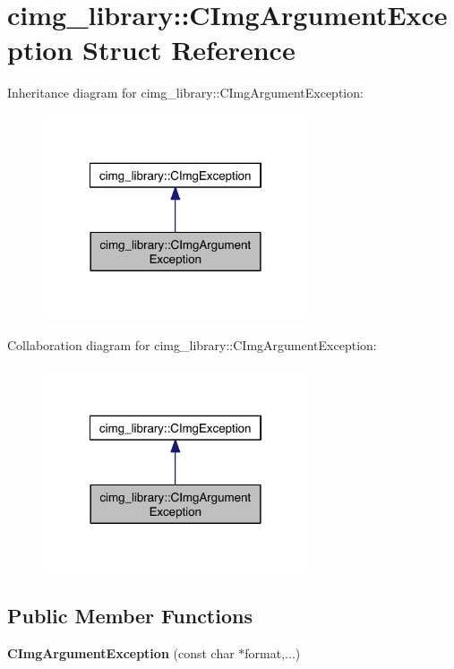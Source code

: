 \hypertarget{structcimg__library_1_1_c_img_argument_exception}{\section{cimg\-\_\-library\-:\-:C\-Img\-Argument\-Exception Struct Reference}
\label{structcimg__library_1_1_c_img_argument_exception}
}


Inheritance diagram for cimg\-\_\-library\-:\-:C\-Img\-Argument\-Exception\-:
\nopagebreak
\begin{figure}[H]
\begin{center}
\leavevmode
\includegraphics[width=222pt]{structcimg__library_1_1_c_img_argument_exception__inherit__graph}
\end{center}
\end{figure}


Collaboration diagram for cimg\-\_\-library\-:\-:C\-Img\-Argument\-Exception\-:
\nopagebreak
\begin{figure}[H]
\begin{center}
\leavevmode
\includegraphics[width=222pt]{structcimg__library_1_1_c_img_argument_exception__coll__graph}
\end{center}
\end{figure}
\subsection*{Public Member Functions}
\begin{DoxyCompactItemize}
\item 
\hypertarget{structcimg__library_1_1_c_img_argument_exception_ae52bd388efe18d588879ccdf117fa8f3}{{\bfseries C\-Img\-Argument\-Exception} (const char $\ast$format,...)}\label{structcimg__library_1_1_c_img_argument_exception_ae52bd388efe18d588879ccdf117fa8f3}

\end{DoxyCompactItemize}
